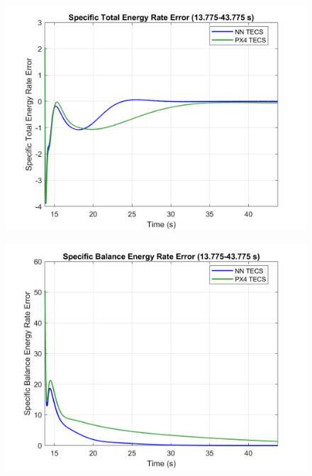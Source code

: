 \documentclass[journal,article,submit,pdftex,moreauthors]{Definitions/mdpi}
\begin{document}
\begin{figure}[H]
    \centering
    \begin{minipage}{0.45\textwidth}
        \centering
        \includegraphics[width=\linewidth]{ste_rate_error_plot.png}
        \label{fig:ste_rate_error}
    \end{minipage}
    \hfill
    \begin{minipage}{0.45\textwidth}
        \centering
        \includegraphics[width=\linewidth]{sbe_rate_error_plot.png}
        \label{fig:sbe_rate_error}
    \end{minipage}
\end{figure}
\end{document}
